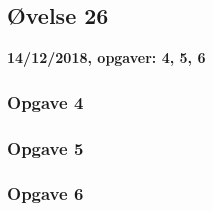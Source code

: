 \horizline

\subsection{Øvelse 26}

\textbf{14/12/2018, opgaver: 4, 5, 6}

\subsubsection{Opgave 4}

\subsubsection{Opgave 5}

\subsubsection{Opgave 6}
